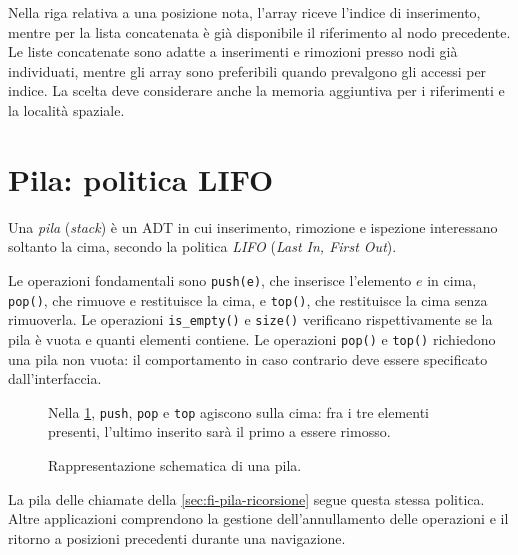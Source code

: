 Nella riga relativa a una posizione nota, l'array riceve
l'indice di inserimento, mentre per la lista concatenata
è già disponibile il riferimento al nodo precedente.
Le liste concatenate sono adatte a inserimenti e rimozioni
presso nodi già individuati, mentre gli array sono preferibili
quando prevalgono gli accessi per indice. La scelta deve
considerare anche la memoria aggiuntiva per i riferimenti e
la località spaziale.

\section{Pila: politica LIFO}
\label{sec:fi-adt-pila}

\begin{definition}[Pila]
\label{def:fi-adt-pila}
Una \emph{pila} (\emph{stack}) è un ADT in cui inserimento,
rimozione e ispezione interessano soltanto la cima, secondo la
politica \emph{LIFO} (\emph{Last In, First Out}).
\end{definition}

\clearpage

Le operazioni fondamentali sono \texttt{push(e)}, che inserisce
l'elemento \(e\) in cima, \texttt{pop()}, che rimuove e restituisce
la cima, e \texttt{top()}, che restituisce la cima senza rimuoverla.
Le operazioni \texttt{is\_empty()} e \texttt{size()} verificano
rispettivamente se la pila è vuota e quanti elementi contiene.
Le operazioni \texttt{pop()} e \texttt{top()} richiedono una pila
non vuota: il comportamento in caso contrario deve essere
specificato dall'interfaccia.

\begin{figure}[htbp]
  \begin{minipage}[c]{0.54\textwidth}
    Nella \cref{fig:fi-pila}, \texttt{push}, \texttt{pop} e
    \texttt{top} agiscono sulla cima: fra i tre elementi presenti,
    l'ultimo inserito sarà il primo a essere rimosso.
  \end{minipage}
  \hfill
  \begin{minipage}[c]{0.40\textwidth}
    \centering
    
  \end{minipage}
  \caption{Rappresentazione schematica di una pila.}
  \label{fig:fi-pila}
\end{figure}

La pila delle chiamate della \cref{sec:fi-pila-ricorsione} segue
questa stessa politica. Altre applicazioni comprendono la gestione
dell'annullamento delle operazioni e il ritorno a posizioni
precedenti durante una navigazione.

